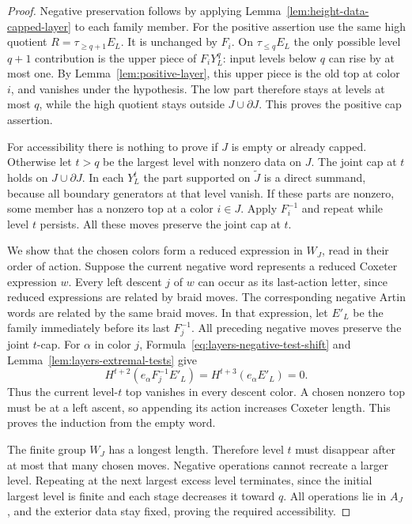 \begin{proof}
Negative preservation follows by applying
Lemma~\ref{lem:height-data-capped-layer} to each family
member.  For the positive assertion use the same high
quotient $R=\tau_{\geq q+1}E_L$.  It is unchanged by
$F_i$.  On $\tau_{\leq q}E_L$ the only possible level
$q+1$ contribution is the upper piece of $F_iY_L^q$:
input levels below $q$ can rise by at most one.  By
Lemma~\ref{lem:positive-layer}, this upper piece is the
old top at color $i$, and vanishes under the hypothesis.
The low part therefore stays at levels at most $q$, while
the high quotient stays outside $J\cup\partial J$.
This proves the positive cap assertion.

For accessibility there is nothing to prove if $J$ is
empty or already capped.  Otherwise let $t>q$ be the
largest level with nonzero data on $J$.  The joint cap at
$t$ holds on $J\cup\partial J$.  In each $Y_L^t$ the
part supported on $\widetilde J$ is a direct summand,
because all boundary generators at that level vanish.
If these parts are nonzero, some member has a nonzero
top at a color $i\in J$.  Apply $F_i^{-1}$ and repeat
while level $t$ persists.  All these moves preserve the
joint cap at $t$.

We show that the chosen colors form a reduced expression
in $W_J$, read in their order of action.  Suppose the
current negative word represents a reduced Coxeter
expression $w$.  Every left descent $j$ of $w$ can occur
as its last-action letter, since reduced expressions are
related by braid moves.  The corresponding negative
Artin words are related by the same braid moves.  In
that expression, let $E'_L$ be the family immediately
before its last $F_j^{-1}$.  All preceding negative
moves preserve the joint $t$-cap.  For $\alpha$ in color
$j$, Formula~\eqref{eq:layers-negative-test-shift} and
Lemma~\ref{lem:layers-extremal-tests} give
\[
 H^{t+2}(e_\alpha F_j^{-1}E'_L)
       =H^{t+3}(e_\alpha E'_L)=0.
\]
Thus the current level-$t$ top vanishes in every descent
color.  A chosen nonzero top must be at a left ascent,
so appending its action increases Coxeter length.
This proves the induction from the empty word.

The finite group $W_J$ has a longest length.  Therefore
level $t$ must disappear after at most that many chosen
moves.  Negative operations cannot recreate a larger
level.  Repeating at the next largest excess level
terminates, since the initial largest level is finite
and each stage decreases it toward $q$.  All operations
lie in $A_J$, and the exterior data stay fixed, proving
the required accessibility.
\end{proof}

